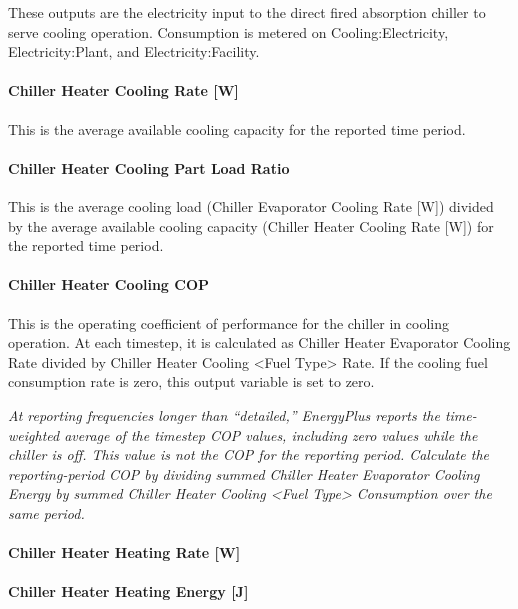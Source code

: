 These outputs are the electricity input to the direct fired absorption chiller to serve cooling operation. Consumption is metered on Cooling:Electricity, Electricity:Plant, and Electricity:Facility.

\paragraph{Chiller Heater Cooling Rate {[}W{]}}\label{chiller-heater-cooling-rate-w}

This is the average available cooling capacity for the reported time period.

\paragraph{Chiller Heater Cooling Part Load Ratio}\label{chiller-heater-cooling-part-load-ratio}

This is the average cooling load (Chiller Evaporator Cooling Rate {[}W{]}) divided by the average available cooling capacity (Chiller Heater Cooling Rate {[}W{]}) for the reported time period.

\paragraph{Chiller Heater Cooling COP}\label{chiller-heater-cooling-cop}

This is the operating coefficient of performance for the chiller in cooling operation. At each timestep, it is calculated as Chiller Heater Evaporator Cooling Rate divided by Chiller Heater Cooling \textless{}Fuel Type\textgreater{} Rate. If the cooling fuel consumption rate is zero, this output variable is set to zero.

\emph{At reporting frequencies longer than ``detailed,'' EnergyPlus reports the time-weighted average of the timestep COP values, including zero values while the chiller is off. This value is not the COP for the reporting period. Calculate the reporting-period COP by dividing summed Chiller Heater Evaporator Cooling Energy by summed Chiller Heater Cooling \textless{}Fuel Type\textgreater{} Consumption over the same period.}

\paragraph{Chiller Heater Heating Rate {[}W{]}}\label{chiller-heater-heating-rate-w}

\paragraph{Chiller Heater Heating Energy {[}J{]}}\label{chiller-heater-heating-energy-j}

